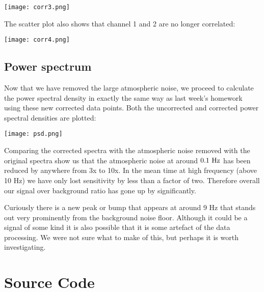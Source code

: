 \documentclass[12pt]{article}
\begin{document}
\begin{center}
\texttt{[image: corr3.png]}
\end{center}

The scatter plot also shows that channel 1 and 2 are no longer correlated:
\begin{center}
\texttt{[image: corr4.png]}
\end{center}

\subsection{Power spectrum}
Now that we have removed the large atmospheric noise, we proceed to calculate the power spectral density in exactly the same way as last week's homework using these new corrected data points.
Both the uncorrected and corrected power spectral densities are plotted:

\begin{center}
\texttt{[image: psd.png]}
\end{center}

Comparing the corrected spectra with the atmospheric noise removed with the original spectra show us that the atmospheric noise at around $0.1~\textnormal{Hz}$ has been reduced by anywhere from 3x to 10x.
In the mean time at high frequency (above 10 Hz) we have only lost sensitivity by less than a factor of two.
Therefore overall our signal over background ratio has gone up by significantly.

Curiously there is a new peak or bump that appears at around 9 Hz that stands out very prominently from the background noise floor. Although it could be a signal of some kind it is also possible that it is some artefact of the data processing. We were not sure what to make of this, but perhaps it is worth investigating.

\section{Source Code}

\end{document}
